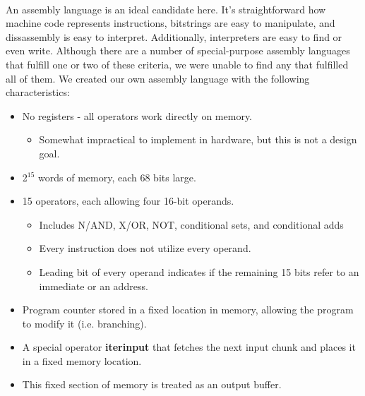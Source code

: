 \documentclass{article}
\begin{document}
\paragraph{}
An assembly language is an ideal candidate here. It's straightforward how machine code represents instructions, bitstrings are easy to manipulate, and dissassembly is easy to interpret. Additionally, interpreters are easy to find or even write.
Although there are a number of special-purpose assembly languages that fulfill one or two of these criteria, we were unable to find any that fulfilled all of them. We created our own assembly language with the following characteristics:

\begin{itemize}
\item No registers - all operators work directly on memory.
	\begin{itemize}
          \item Somewhat impractical to implement in hardware, but this is not a design goal.
	\end{itemize}
	\item 2$^{15}$ words of memory, each 68 bits large.
	\item 15 operators, each allowing four 16-bit operands.
	\begin{itemize}
		  \item Includes N/AND, X/OR, NOT, conditional sets, and conditional adds
          \item Every instruction does not utilize every operand.
          \item Leading bit of every operand indicates if the remaining 15 bits refer to an immediate or an address.
	\end{itemize}
	\item Program counter stored in a fixed location in memory, allowing the program to modify it (i.e. branching).
	\item A special operator \textbf{iterinput} that fetches the next input chunk and places it in a fixed memory location.
	\item This fixed section of memory is treated as an output buffer.
\end{itemize}
\end{document}
